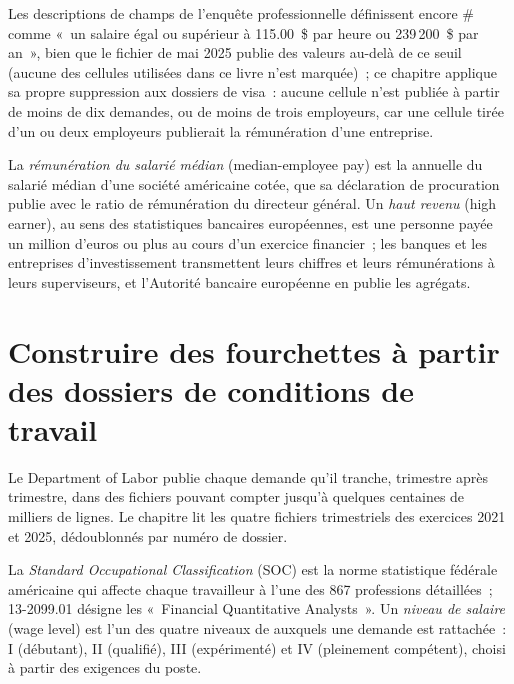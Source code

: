 Les descriptions de champs de l'enquête professionnelle définissent encore \# comme «~un salaire égal ou supérieur à 115.00~\$ par heure ou
239\,200~\$ par an~», bien que le fichier de mai 2025 publie des valeurs au-delà de ce seuil (aucune des cellules utilisées dans ce livre n'est
marquée)~; ce chapitre applique sa propre suppression aux dossiers de visa~: aucune cellule n'est publiée à partir de moins de dix demandes, ou de
moins de trois employeurs, car une cellule tirée d'un ou deux employeurs publierait la rémunération d'une entreprise.

\begin{definition}\label{def:in:pay-levels-by-role-firm-type-and-seniority:median}
La \emph{rémunération du salarié médian} (median-employee pay) est la  annuelle du salarié médian
d'une société américaine cotée, que sa déclaration de procuration publie avec le ratio de rémunération du directeur général.
Un \emph{haut revenu} (high earner), au sens des statistiques bancaires européennes, est une personne payée un million d'euros ou plus au cours d'un exercice financier~;
les banques et les entreprises d'investissement transmettent leurs chiffres et leurs rémunérations à leurs superviseurs, et l'Autorité bancaire européenne
en publie les agrégats.
\end{definition}

\section{Construire des fourchettes à partir des dossiers de conditions de travail}

Le Department of Labor publie chaque demande qu'il tranche, trimestre après trimestre, dans des fichiers pouvant compter jusqu'à quelques centaines
de milliers de lignes. Le chapitre lit les quatre fichiers trimestriels des exercices 2021 et 2025, dédoublonnés par numéro de dossier.

\begin{definition}\label{def:in:pay-levels-by-role-firm-type-and-seniority:soc}
La \emph{Standard Occupational Classification} (SOC) est la norme statistique fédérale américaine qui affecte chaque travailleur
à l'une des 867 professions détaillées~; 13-2099.01 désigne les «~Financial Quantitative Analysts~». Un
\emph{niveau de salaire} (wage level) est l'un des quatre niveaux de  auxquels une demande est rattachée~:
I (débutant), II (qualifié), III (expérimenté) et IV (pleinement compétent), choisi à partir des exigences du poste.
\end{definition}


